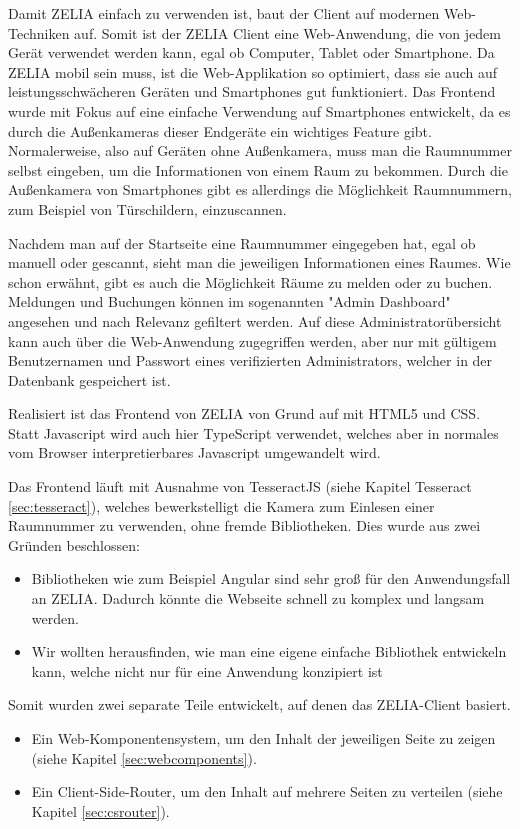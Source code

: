 
Damit ZELIA einfach zu verwenden ist, baut der Client auf modernen Web-Techniken auf. Somit ist der ZELIA Client eine Web-Anwendung,  die von jedem Gerät verwendet werden kann, egal ob Computer, Tablet oder Smartphone. Da ZELIA mobil sein muss, ist die Web-Applikation so optimiert, dass sie auch auf leistungsschwächeren Geräten und Smartphones gut funktioniert. Das Frontend wurde mit Fokus auf eine einfache Verwendung auf Smartphones entwickelt, da es durch die Außenkameras dieser Endgeräte ein wichtiges Feature gibt. Normalerweise, also auf Geräten ohne Außenkamera, muss man die Raumnummer selbst eingeben, um die Informationen von einem Raum zu bekommen. Durch die Außenkamera von Smartphones gibt es allerdings die Möglichkeit Raumnummern, zum Beispiel von Türschildern, einzuscannen. 

Nachdem man auf der Startseite eine Raumnummer eingegeben hat, egal ob manuell oder gescannt, sieht man die jeweiligen Informationen eines Raumes. Wie schon erwähnt, gibt es auch die Möglichkeit Räume zu melden oder zu buchen. Meldungen und Buchungen können im sogenannten "Admin Dashboard" angesehen und nach Relevanz gefiltert werden. Auf diese Administratorübersicht kann auch über die Web-Anwendung zugegriffen werden, aber nur mit gültigem Benutzernamen und Passwort eines verifizierten Administrators, welcher in der Datenbank gespeichert ist.

Realisiert ist das Frontend von ZELIA von Grund auf mit HTML5 und CSS. Statt Javascript wird auch hier TypeScript verwendet, welches aber in normales vom Browser interpretierbares Javascript umgewandelt wird. 

Das Frontend läuft mit Ausnahme von TesseractJS (siehe Kapitel Tesseract \ref{sec:tesseract}), welches bewerkstelligt die Kamera zum Einlesen einer Raumnummer zu verwenden, ohne fremde Bibliotheken. Dies wurde aus zwei Gründen beschlossen:
\begin{itemize}
    \item Bibliotheken wie zum Beispiel Angular sind sehr groß für den Anwendungsfall an ZELIA. Dadurch könnte die Webseite schnell zu komplex und langsam werden.
    \item Wir wollten herausfinden, wie man eine eigene einfache Bibliothek entwickeln kann, welche nicht nur für eine Anwendung konzipiert ist
\end{itemize}

Somit wurden zwei separate Teile entwickelt, auf denen das ZELIA-Client basiert. 
\begin{itemize}
    \item Ein Web-Komponentensystem, um den Inhalt der jeweiligen Seite zu zeigen (siehe Kapitel \ref{sec:webcomponents}).
    \item Ein Client-Side-Router, um den Inhalt auf mehrere Seiten zu verteilen (siehe Kapitel \ref{sec:csrouter}).
\end{itemize}
